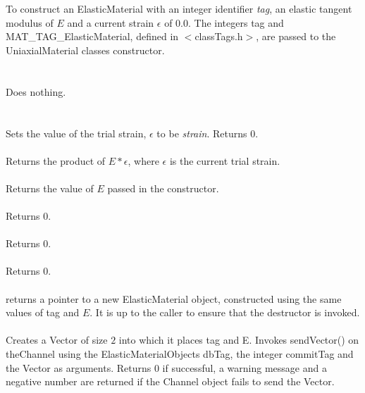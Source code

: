   \\
  \\
To construct an ElasticMaterial with an integer identifier {\em
tag}, an elastic tangent modulus of $E$ and a current strain
$\epsilon$ of $0.0$. The integers \p tag and
MAT\_TAG\_ElasticMaterial, defined in $<$classTags.h$>$, are passed 
to the UniaxialMaterial classes constructor. \\

 \\
\\ 
Does nothing. \\

 \\
  \\
Sets the value of the trial strain, $\epsilon$ to be {\em
strain}. Returns $0$.\\

 \\
Returns the product of $E * \epsilon$, where $\epsilon$ is the current
trial strain. \\

 \\
Returns the value of $E$ passed in the constructor. \\

 \\
Returns $0$. \\

 \\
Returns $0$. \\

 \\
Returns $0$. \\

 \\
returns a pointer to a new ElasticMaterial object, constructed
using the same values of \p tag and $E$. It is up to the caller to
ensure that the destructor is invoked. \\

\\
Creates a Vector of size $2$ into which it places  \p tag and
\p E. Invokes sendVector() on  \p theChannel using the
ElasticMaterialObjects \p dbTag, the integer \p commitTag and
the Vector as arguments. Returns $0$ if successful, a warning message
and a negative number are returned if the Channel object fails to send
the Vector. \\


